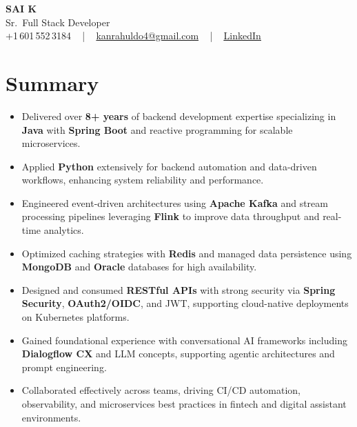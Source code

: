 \documentclass[letterpaper,11pt]{article}
\newcommand{\resumeItem}[1]{
  \item\footnotesize{
    {#1 \vspace{-2pt}}
  }
}
\newcommand{\resumeItemListStart}{\begin{itemize}[leftmargin=*]}
\newcommand{\resumeItemListEnd}{\end{itemize}\vspace{-5pt}}
\begin{document}
\begin{center}
    {\fontsize{14pt}{12pt}\selectfont \textbf{\MakeUppercase{Sai K}}}\\ \vspace{2pt}
    \fontsize{10pt}{12pt}\selectfont Sr.\ Full Stack Developer\\ \vspace{2pt}
    \fontsize{10pt}{12pt}\selectfont +1\,601\,552\,3184 ~ | ~
    \href{mailto:kanrahuldo4@gmail.com}{kanrahuldo4@gmail.com} ~ | ~
    \href{https://www.linkedin.com/in/srrrk/}{\color{blue}\underline{LinkedIn}}
    \vspace{-10pt}
\end{center}

\section{Summary}
\fontsize{9pt}{10pt}\selectfont
\resumeItemListStart
  \resumeItem{Delivered over \textbf{8+ years} of backend development expertise specializing in \textbf{Java} with \textbf{Spring Boot} and reactive programming for scalable microservices.}
  \resumeItem{Applied \textbf{Python} extensively for backend automation and data-driven workflows, enhancing system reliability and performance.}
  \resumeItem{Engineered event-driven architectures using \textbf{Apache Kafka} and stream processing pipelines leveraging \textbf{Flink} to improve data throughput and real-time analytics.}
  \resumeItem{Optimized caching strategies with \textbf{Redis} and managed data persistence using \textbf{MongoDB} and \textbf{Oracle} databases for high availability.}
  \resumeItem{Designed and consumed \textbf{RESTful APIs} with strong security via \textbf{Spring Security}, \textbf{OAuth2/OIDC}, and JWT, supporting cloud-native deployments on Kubernetes platforms.}
  \resumeItem{Gained foundational experience with conversational AI frameworks including \textbf{Dialogflow CX} and LLM concepts, supporting agentic architectures and prompt engineering.}
  \resumeItem{Collaborated effectively across teams, driving CI/CD automation, observability, and microservices best practices in fintech and digital assistant environments.}
\resumeItemListEnd
\vspace{-6pt}

\end{document}
